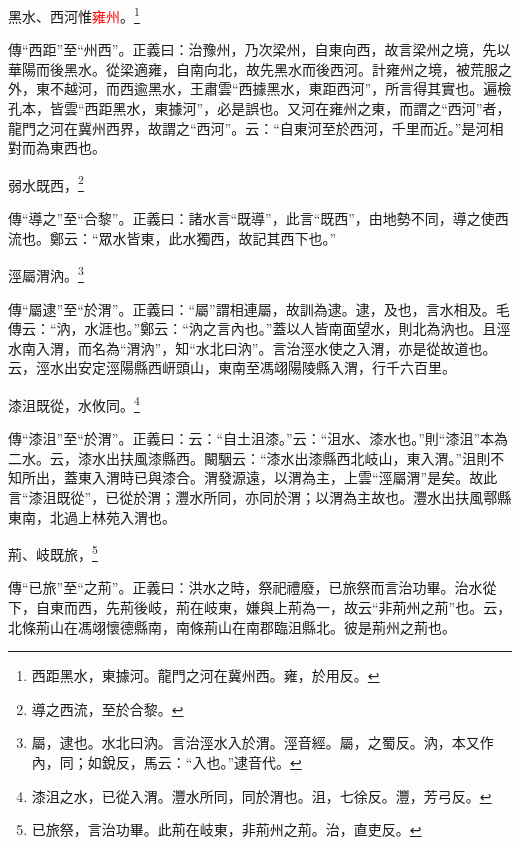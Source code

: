 黑水、西河惟\textcolor{red}{雍州}。\footnote{西距黑水，東據河。龍門之河在冀州西。雍，於用反。}

{\noindent\zhuan{}\fzbyks 傳“西距”至“州西”。正義曰：治豫州，乃次梁州，自東向西，故言梁州之境，先以華陽而後黑水。從梁適雍，自南向北，故先黑水而後西河。計雍州之境，被荒服之外，東不越河，而西逾黑水，王肅雲“西據黑水，東距西河”，所言得其實也。遍檢孔本，皆雲“西距黑水，東據河”，必是誤也。又河在雍州之東，而謂之“西河”者，龍門之河在冀州西界，故謂之“西河”。云：“自東河至於西河，千里而近。”是河相對而為東西也。 \par}

弱水既西，\footnote{導之西流，至於合黎。}

{\noindent\zhuan{}\fzbyks 傳“導之”至“合黎”。正義曰：諸水言“既導”，此言“既西”，由地勢不同，導之使西流也。鄭云：“眾水皆東，此水獨西，故記其西下也。” \par}

涇屬渭汭。\footnote{屬，逮也。水北曰汭。言治涇水入於渭。涇音經。屬，之蜀反。汭，本又作內，同；如銳反，馬云：“入也。”逮音代。}

{\noindent\zhuan{}\fzbyks 傳“屬逮”至“於渭”。正義曰：“屬”謂相連屬，故訓為逮。逮，及也，言水相及。毛傳云：“汭，水涯也。”鄭云：“汭之言內也。”蓋以人皆南面望水，則北為汭也。且涇水南入渭，而名為“渭汭”，知“水北曰汭”。言治涇水使之入渭，亦是從故道也。云，涇水出安定涇陽縣西岍頭山，東南至馮翊陽陵縣入渭，行千六百里。 \par}

漆沮既從，水攸同。\footnote{漆沮之水，已從入渭。灃水所同，同於渭也。沮，七徐反。灃，芳弓反。}

{\noindent\zhuan{}\fzbyks 傳“漆沮”至“於渭”。正義曰：云：“自土沮漆。”云：“沮水、漆水也。”則“漆沮”本為二水。云，漆水出扶風漆縣西。闞駰云：“漆水出漆縣西北岐山，東入渭。”沮則不知所出，蓋東入渭時已與漆合。渭發源遠，以渭為主，上雲“涇屬渭”是矣。故此言“漆沮既從”，已從於渭；灃水所同，亦同於渭；以渭為主故也。灃水出扶風鄠縣東南，北過上林苑入渭也。 \par}

荊、岐既旅，\footnote{已旅祭，言治功畢。此荊在岐東，非荊州之荊。治，直吏反。}

{\noindent\zhuan{}\fzbyks 傳“已旅”至“之荊”。正義曰：洪水之時，祭祀禮廢，已旅祭而言治功畢。治水從下，自東而西，先荊後岐，荊在岐東，嫌與上荊為一，故云“非荊州之荊”也。云，北條荊山在馮翊懷德縣南，南條荊山在南郡臨沮縣北。彼是荊州之荊也。 \par}

